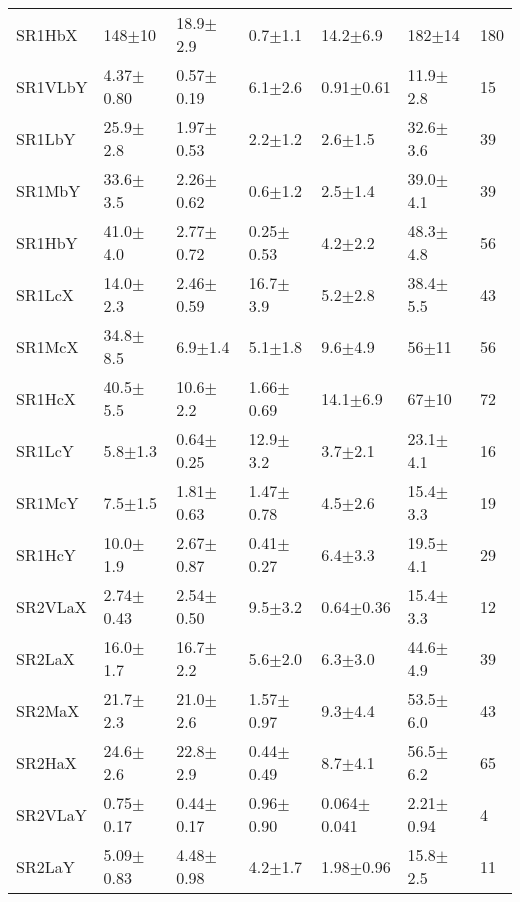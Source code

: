 \begin{table}
\begin{center}
\begin{tabular}{l l l l l l || l }
SR1HbX    &  148$\pm$10     &    18.9$\pm$2.9  &     0.7$\pm$1.1   &    14.2$\pm$6.9    &    182$\pm$14     &   180 \\ 
SR1VLbY   &  4.37$\pm$0.80   &    0.57$\pm$0.19 &     6.1$\pm$2.6   &    0.91$\pm$0.61   &    11.9$\pm$2.8   &   15 \\ 
SR1LbY    &  25.9$\pm$2.8    &    1.97$\pm$0.53 &     2.2$\pm$1.2   &    2.6$\pm$1.5    &    32.6$\pm$3.6   &   39 \\ 
SR1MbY    &  33.6$\pm$3.5    &    2.26$\pm$0.62 &     0.6$\pm$1.2   &    2.5$\pm$1.4    &    39.0$\pm$4.1   &   39 \\ 
SR1HbY    &  41.0$\pm$4.0    &    2.77$\pm$0.72 &     0.25$\pm$0.53  &    4.2$\pm$2.2    &    48.3$\pm$4.8   &   56 \\ 
SR1LcX    &  14.0$\pm$2.3    &    2.46$\pm$0.59 &     16.7$\pm$3.9   &    5.2$\pm$2.8    &    38.4$\pm$5.5   &   43 \\ 
SR1McX    &  34.8$\pm$8.5    &    6.9$\pm$1.4  &     5.1$\pm$1.8   &    9.6$\pm$4.9    &    56$\pm$11      &   56 \\ 
SR1HcX    &  40.5$\pm$5.5    &    10.6$\pm$2.2  &     1.66$\pm$0.69  &    14.1$\pm$6.9    &    67$\pm$10      &   72 \\ 
SR1LcY    &  5.8$\pm$1.3    &    0.64$\pm$0.25 &     12.9$\pm$3.2   &    3.7$\pm$2.1    &    23.1$\pm$4.1   &   16 \\ 
SR1McY    &  7.5$\pm$1.5    &    1.81$\pm$0.63 &     1.47$\pm$0.78  &    4.5$\pm$2.6    &    15.4$\pm$3.3   &   19 \\ 
SR1HcY    &  10.0$\pm$1.9    &    2.67$\pm$0.87 &     0.41$\pm$0.27  &    6.4$\pm$3.3    &    19.5$\pm$4.1   &   29 \\ 
SR2VLaX   &  2.74$\pm$0.43   &    2.54$\pm$0.50 &     9.5$\pm$3.2   &    0.64$\pm$0.36   &    15.4$\pm$3.3   &   12 \\ 
SR2LaX    &  16.0$\pm$1.7    &    16.7$\pm$2.2  &     5.6$\pm$2.0   &    6.3$\pm$3.0    &    44.6$\pm$4.9   &   39 \\ 
SR2MaX    &  21.7$\pm$2.3    &    21.0$\pm$2.6  &     1.57$\pm$0.97  &    9.3$\pm$4.4    &    53.5$\pm$6.0   &   43 \\ 
SR2HaX    &  24.6$\pm$2.6    &    22.8$\pm$2.9  &     0.44$\pm$0.49  &    8.7$\pm$4.1    &    56.5$\pm$6.2   &   65 \\ 
SR2VLaY   &  0.75$\pm$0.17   &    0.44$\pm$0.17 &     0.96$\pm$0.90  &    0.064$\pm$0.041  &    2.21$\pm$0.94  &   4 \\ 
SR2LaY    &  5.09$\pm$0.83   &    4.48$\pm$0.98 &     4.2$\pm$1.7   &    1.98$\pm$0.96   &    15.8$\pm$2.5   &   11 \\ 

\end{tabular}
\end{center}
\end{table}
